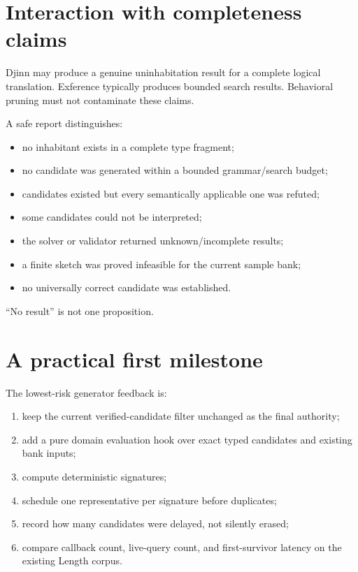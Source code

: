 \documentclass[10pt,letterpaper,oneside]{report}
\begin{document}
\section{Interaction with completeness claims}

Djinn may produce a genuine uninhabitation result for a complete logical translation. Exference typically produces bounded search results. Behavioral pruning must not contaminate these claims.

A safe report distinguishes:

\begin{itemize}
\item no inhabitant exists in a complete type fragment;
\item no candidate was generated within a bounded grammar/search budget;
\item candidates existed but every semantically applicable one was refuted;
\item some candidates could not be interpreted;
\item the solver or validator returned unknown/incomplete results;
\item a finite sketch was proved infeasible for the current sample bank;
\item no universally correct candidate was established.
\end{itemize}

``No result'' is not one proposition.

\section{A practical first milestone}

The lowest-risk generator feedback is:

\begin{enumerate}
\item keep the current verified-candidate filter unchanged as the final authority;
\item add a pure domain evaluation hook over exact typed candidates and existing bank inputs;
\item compute deterministic signatures;
\item schedule one representative per signature before duplicates;
\item record how many candidates were delayed, not silently erased;
\item compare callback count, live-query count, and first-survivor latency on the existing Length corpus.
\end{enumerate}
\end{document}
